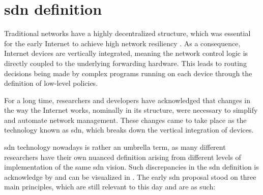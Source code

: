 \section[SDN definition]{\gls{sdn} definition}

Traditional networks have a highly decentralized structure, which was essential for the early Internet to achieve high network resiliency \cite{kreutz_software-defined_2015}. As a consequence, Internet devices are vertically integrated, meaning the network control logic is directly coupled to the underlying forwarding hardware. This leads to routing decisions being made by complex programs running on each device through the definition of low-level policies. \cite{bifulco_survey_2018}

For a long time, researchers and developers have acknowledged that changes in the way the Internet works, nominally in its structure, were necessary to simplify and automate network management. These changes came to take place as the technology known as \gls{sdn}, which breaks down the vertical integration of devices.  \cite{thyagaturu_software_2016}

\gls{sdn} technology nowadays is rather an umbrella term, as many different researchers have their own nuanced definition arising from different levels of implementation of the same \gls{sdn} vision. Such discrepancies in the \gls{sdn} definition is acknowledge by \cite{livro} and can be visualized in \cite{feamster_road_2013} \cite{thyagaturu_software_2016} \cite{nunes_survey_2014} \cite{bifulco_survey_2018}.
The early \gls{sdn} proposal stood on three main principles, which are still relevant to this day and are as such:

